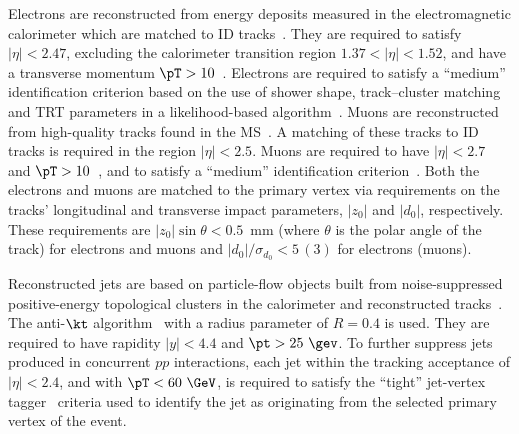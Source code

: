 \documentclass[PAPER, cernpreprint, texlive=2016, paper=a4, USenglish, texmf]{atlasdoc}
\begin{document}
Electrons are reconstructed from energy deposits measured in the electromagnetic calorimeter which are matched to ID tracks~\cite{EGAM-2018-01}.
They are required to satisfy $|\eta| < 2.47$, excluding the calorimeter transition region $1.37 < |\eta| < 1.52$, and have a transverse momentum $\pT > 10$~\GeV.
Electrons are required to satisfy a ``medium'' identification criterion based on the use of shower shape, track--cluster matching and TRT parameters in a likelihood-based algorithm~\cite{EGAM-2018-01}. 
Muons are reconstructed from high-quality tracks found in the MS~\cite{PERF-2015-10}.
A matching of these tracks to ID tracks is required in the region $|\eta| < 2.5$. Muons are required to have $|\eta| < 2.7$ and $\pT > 10$~\GeV, and to satisfy a ``medium'' identification criterion~\cite{MUON-2018-03}.
Both the electrons and muons are matched to the primary vertex via requirements on the tracks' longitudinal and transverse impact parameters, $|z_{0}|$ and $|d_{0}|$, respectively.
These requirements are $|z_{0}| \sin \theta < 0.5$~mm (where $\theta$ is the polar angle of the track) for electrons and muons and  $|d_{0}|/\sigma_{d_{0}} < 5\,(3)$ for electrons (muons).
 
 
Reconstructed jets are based on particle-flow objects built from noise-suppressed positive-energy topological clusters in the calorimeter and reconstructed tracks~\cite{PERF-2015-09}.
The anti-$\kt$ algorithm~\cite{Cacciari:2011ma,Cacciari:2008gp} with a radius parameter of $R=0.4$ is used.
They are required to have rapidity $|y|<4.4$ and $\pt>25~\gev$.
To further suppress jets produced in concurrent $pp$ interactions, each jet within the tracking acceptance of $|\eta|<2.4$, and with $\pT < 60~\GeV$, is required to satisfy the ``tight'' jet-vertex tagger~\cite{ATLAS-CONF-2014-018} criteria used to identify the jet as originating from the selected primary vertex of the event.
 
\end{document}
